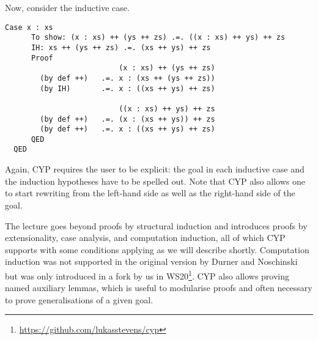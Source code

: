 Now, consider the inductive case.
\begin{lstlisting}[style=cyp]
    Case x : xs
      To show: (x : xs) ++ (ys ++ zs) .=. ((x : xs) ++ ys) ++ zs
      IH: xs ++ (ys ++ zs) .=. (xs ++ ys) ++ zs
      Proof
                          (x : xs) ++ (ys ++ zs)
        (by def ++)   .=. x : (xs ++ (ys ++ zs))
        (by IH)       .=. x : ((xs ++ ys) ++ zs)

                          ((x : xs) ++ ys) ++ zs
        (by def ++)   .=. (x : (xs ++ ys)) ++ zs
        (by def ++)   .=. x : ((xs ++ ys) ++ zs)
      QED
  QED
\end{lstlisting}
Again, CYP requires the user to be explicit: the goal in each inductive case and the induction hypotheses have to be spelled out.
Note that CYP also allows one to start rewriting from the left-hand side as well as the right-hand side of the goal.

The lecture goes beyond proofs by structural induction and introduces proofs by extensionality, case analysis, and computation induction,
all of which CYP supports with some conditions applying as we will describe shortly.
Computation induction was not supported in the original version by Durner and Noschinski but was only introduced in a fork by us in WS20\footnote{\url{https://github.com/lukasstevens/cyp}}.
CYP also allows proving named auxiliary lemmas,
which is useful to modularise proofs
and often necessary to prove generalisations of a given goal.

